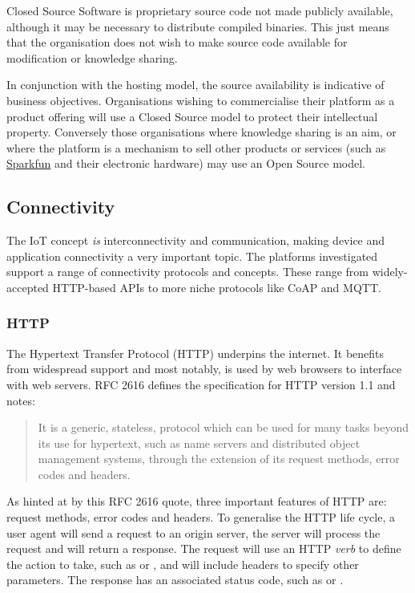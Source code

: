       Closed Source Software is proprietary source code not made publicly available, although it may be necessary to distribute compiled binaries. This just means that the organisation does not wish to make source code available for modification or knowledge sharing. 

      In conjunction with the hosting model, the source availability is indicative of business objectives. Organisations wishing to commercialise their platform as a product offering will use a Closed Source model to protect their intellectual property. Conversely those organisations where knowledge sharing is an aim, or where the platform is a mechanism to sell other products or services (such as \href{https://data.sparkfun.com/}{Sparkfun} and their electronic hardware) may use an Open Source model.

    \subsection{Connectivity}
      The IoT concept \emph{is} interconnectivity and communication, making device and application connectivity a very important topic. The platforms investigated support a range of connectivity protocols and concepts. These range from widely-accepted HTTP-based APIs to more niche protocols like CoAP and MQTT.

      \subsubsection{HTTP}
        The Hypertext Transfer Protocol (HTTP) underpins the internet. It benefits from widespread support and most notably, is used by web browsers to interface with web servers. RFC 2616 \citep{rfc2616} defines the specification for HTTP version 1.1 and notes:

          \begin{quote}It is a generic, stateless, protocol which can be used for many tasks beyond its use for hypertext, such as name servers and distributed object management systems, through the extension of its request methods, error codes and headers.\end{quote}

        As hinted at by this RFC 2616 quote, three important features of HTTP are: request methods, error codes and headers. To generalise the HTTP life cycle, a user agent will send a request to an origin server, the server will process the request and will return a response. The request will use an HTTP \emph{verb} to define the action to take, such as  or , and will include headers to specify other parameters. The response has an associated status code, such as  or .

